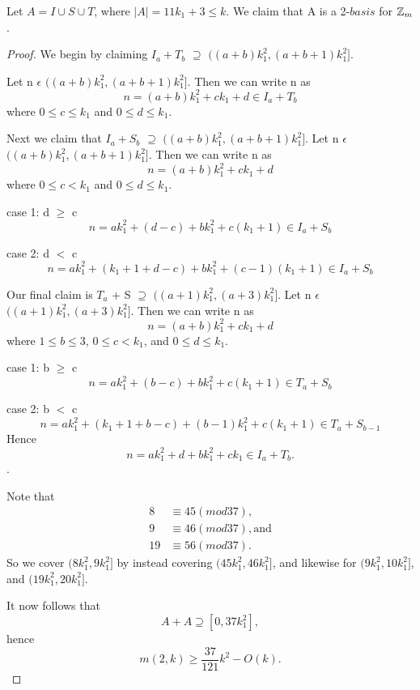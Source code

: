 Let $A = I \cup S \cup T$, where $|A| = 11k_1 + 3 \leq k$. We claim that A is a 2-$basis$ for $\mbox{$\mathbb Z$}_m$.
\\ 
\begin{proof}
We begin by claiming $I_a + T_b$ $\supseteq$ $((a + b)k_1^2 ,  (a + b + 1)k_1^2]$. 

Let n $\epsilon$ $((a + b)k_1^2 ,  (a + b + 1)k_1^2]$.
Then we can write n as 
\[
n = (a + b) k_1^2 + ck_1 + d \in I_a + T_b
\]
where $0 \leq c \leq k_1$ and $0 \leq d \leq k_1$. 

Next we claim that  $I_a + S_b$ $\supseteq$ $((a + b)k_1^2 ,  (a + b + 1)k_1^2]$. 
Let n $\epsilon$ $((a + b)k_1^2 ,  (a + b + 1)k_1^2]$.
Then we can write n as 
\[
n = (a + b) k_1^2 + ck_1 + d 
\]
where  $0 \leq c < k_1$ and $0 \leq d \leq k_1$. 

case 1: d $\geq$ c
\[
n = ak_1^2 + (d - c) + bk_1^2 + c(k_1 + 1) \in I_a + S_b
\]

case 2: d $<$ c
\[
n = ak_1^2 + (k_1 + 1 + d - c) + bk_1^2 + (c - 1)(k_1 + 1) \in  I_a + S_b
\]

Our final claim is $T_a$ + S $\supseteq$ $((a +1)k_1^2 ,  (a + 3)k_1^2]$. 
Let n $\epsilon$ $((a +1)k_1^2 ,  (a + 3)k_1^2]$.
Then we can write n as 
\[
n = (a + b) k_1^2 + ck_1 + d 
\]
where $1 \leq b \leq 3$, $0 \leq c < k_1$, and $0 \leq d \leq k_1$. 

case 1: b $\geq$ c
\[
n = ak_1^2 + (b - c) + bk_1^2 + c(k_1 + 1) \in T_a + S_b
\]

case 2: b $<$ c
\[
n = ak_1^2 + (k_1 + 1 + b - c) + (b - 1)k_1^2 + c(k_1 + 1) \in  T_a + S_{b-1}
\]
Hence 
\[
n = ak_1^2 + d + bk_1^2 + ck_1 \in I_a + T_b.
\].

Note that
\begin{align*}
8 &\equiv 45 (mod 37),\\
 9 &\equiv 46 (mod 37),  \text{and} \\
19 &\equiv 56 (mod 37).
\end{align*} 
So we cover $(8k_1^2, 9k_1^2]$ by instead covering $(45k_1^2, 46k_1^2]$, and likewise for $(9k_1^2, 10k_1^2]$, and $(19k_1^2, 20k_1^2]$. 

It now follows that 
\[
A + A \supseteq [0, 37k_1^2],
\]
hence
\[
m(2,k) \geq \frac{37}{121}k^2 - O(k). 
\]


\end{proof}
